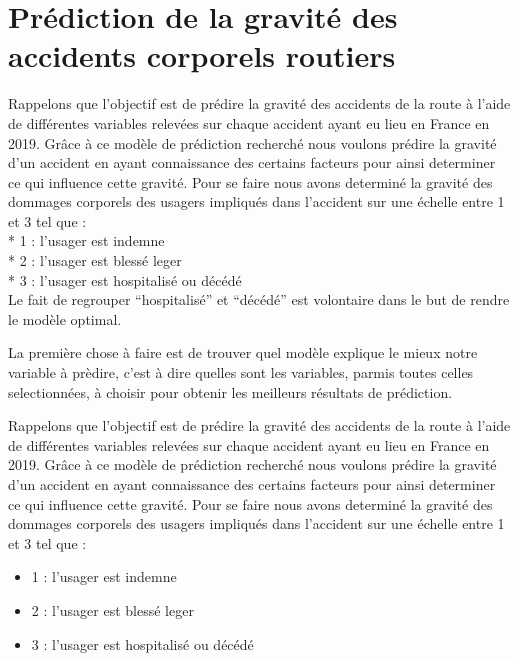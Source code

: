 \documentclass[french,]{tp}
\providecommand{\tightlist}{%
  \setlength{\itemsep}{0pt}\setlength{\parskip}{0pt}}
\begin{document}
\newpage

\hypertarget{pruxe9diction-de-la-gravituxe9-des-accidents-corporels-routiers}{%
\section{Prédiction de la gravité des accidents corporels routiers}\label{pruxe9diction-de-la-gravituxe9-des-accidents-corporels-routiers}}

Rappelons que l'objectif est de prédire la gravité des accidents de la route à l'aide de différentes variables relevées sur chaque accident ayant eu lieu en France en 2019. Grâce à ce modèle de prédiction recherché nous voulons prédire la gravité d'un accident en ayant connaissance des certains facteurs pour ainsi determiner ce qui influence cette gravité. Pour se faire nous avons determiné la gravité des dommages corporels des usagers impliqués dans l'accident sur une échelle entre 1 et 3 tel que :\\
* 1 : l'usager est indemne\\
* 2 : l'usager est blessé leger\\
* 3 : l'usager est hospitalisé ou décédé\\
Le fait de regrouper ``hospitalisé'' et ``décédé'' est volontaire dans le but de rendre le modèle optimal.

La première chose à faire est de trouver quel modèle explique le mieux notre variable à prèdire, c'est à dire quelles sont les variables, parmis toutes celles selectionnées, à choisir pour obtenir les meilleurs résultats de prédiction.

Rappelons que l'objectif est de prédire la gravité des accidents de la route à l'aide de différentes variables relevées sur chaque accident ayant eu lieu en France en 2019. Grâce à ce modèle de prédiction recherché nous voulons prédire la gravité d'un accident en ayant connaissance des certains facteurs pour ainsi determiner ce qui influence cette gravité. Pour se faire nous avons determiné la gravité des dommages corporels des usagers impliqués dans l'accident sur une échelle entre 1 et 3 tel que :

\begin{itemize}
\tightlist
\item
  1 : l'usager est indemne\\
\item
  2 : l'usager est blessé leger\\
\item
  3 : l'usager est hospitalisé ou décédé
\end{itemize}
\end{document}
